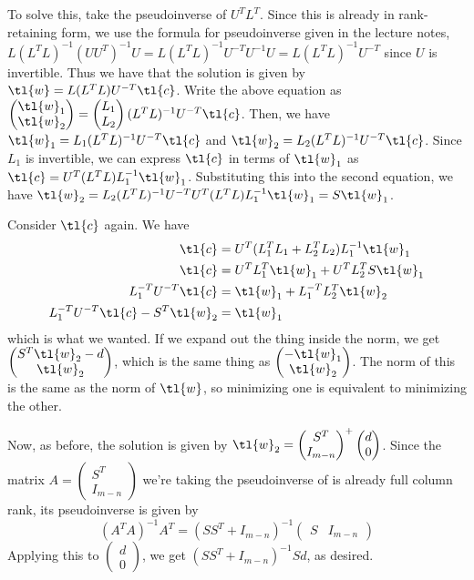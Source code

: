 \documentclass{article}
\newcommand{\openm}{\begin{pmatrix}}
\newcommand{\closem}{\end{pmatrix}}
\begin{document}
To solve this, take the pseudoinverse of $U^TL^T$. Since this is already in rank-retaining form, we use the formula for pseudoinverse given in the lecture notes, $L(L^TL)^{-1}(UU^T)^{-1}U=L(L^TL)^{-1}U^{-T}U^{-1}U=L(L^TL)^{-1}U^{-T}$ since $U$ is invertible. Thus we have that the solution is given by $\tl{w}=L(L^TL)U^{-T}\tl{c}$.
Write the above equation as $\openm\tl{w}_1\\\tl{w}_2\closem=\openm L_1\\L_2\closem(L^TL)^{-1}U^{-T}\tl{c}$. Then, we have $\tl{w}_1=L_1(L^TL)^{-1}U^{-T}\tl{c}$ and $\tl{w}_2=L_2(L^TL)^{-1}U^{-T}\tl{c}$. Since $L_1$ is invertible, we can express $\tl{c}$ in terms of $\tl{w}_1$ as $\tl{c}=U^T(L^TL)L_1^{-1}\tl{w}_1$. Substituting this into the second equation, we have $\tl{w}_2=L_2(L^TL)^{-1}U^{-T}U^T(L^TL)L_1^{-1}\tl{w}_1=S\tl{w}_1$. 

Consider $\tl{c}$ again. We have 
\begin{align*}
    \tl{c}&=U^T(L_1^TL_1+L_2^TL_2)L_1^{-1}\tl{w}_1\\
    \tl{c}&=U^TL_1^T\tl{w}_1+U^TL_2^TS\tl{w}_1\\
    L_1^{-T}U^{-T}\tl{c}&=\tl{w}_1+L_1^{-T}L_2^T\tl{w}_2\\
    L_1^{-T}U^{-T}\tl{c}-S^T\tl{w}_2&=\tl{w}_1\\
\end{align*}
which is what we wanted.
If we expand out the thing inside the norm, we get $\openm S^T\tl{w}_2-d\\\tl{w}_2\closem$, which is the same thing as $\openm -\tl{w}_1\\\tl{w}_2\closem$. The norm of this is the same as the norm of $\tl{w}$, so minimizing one is equivalent to minimizing the other.

Now, as before, the solution is given by $\tl{w}_2=\openm S^T\\I_{m-n}\closem^+\openm d\\0\closem$. Since the matrix $A=\openm S^T\\I_{m-n}\closem$ we're taking the pseudoinverse of is already full column rank, its pseudoinverse is given by
\[(A^TA)^{-1}A^T=(SS^T+I_{m-n})^{-1}\openm S&I_{m-n}\closem\]
Applying this to $\openm d\\0\closem$, we get $(SS^T+I_{m-n})^{-1}Sd$, as desired.
\end{document}
